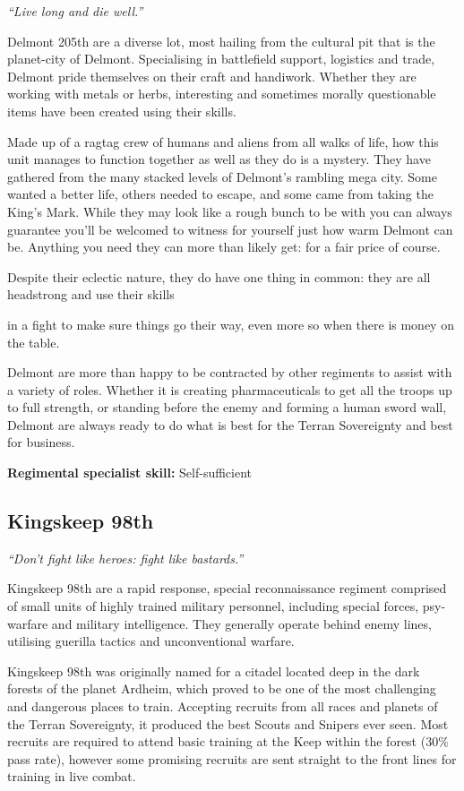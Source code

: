 \textit{``Live long and die well.''}

Delmont 205th are a diverse lot, most hailing from the cultural pit that is the planet-city of Delmont. Specialising in battlefield support, logistics and trade, Delmont pride themselves on their craft and handiwork. Whether they are working with metals or herbs, interesting and sometimes morally questionable items have been created using their skills.

Made up of a ragtag crew of humans and aliens from all walks of life, how this unit manages to function together as well as they do is a mystery. They have gathered from the many stacked levels of Delmont's rambling mega city. Some wanted a better life, others needed to escape, and some came from taking the King's Mark. While they may look like a rough bunch to be with you can always guarantee you'll be welcomed to witness for yourself just how warm Delmont can be. Anything you need they can more than likely get: for a fair price of course.

Despite their eclectic nature, they do have one thing in common: they are all headstrong and use their skills

in a fight to make sure things go their way, even more so when there is money on the table.

Delmont are more than happy to be contracted by other regiments to assist with a variety of roles. Whether it is creating pharmaceuticals to get all the troops up to full strength, or standing before the enemy and forming a human sword wall, Delmont are always ready to do what is best for the Terran Sovereignty and best for business.

\textbf{Regimental specialist skill:} Self-sufficient

\subsection{Kingskeep 98th}

\textit{``Don't fight like heroes: fight like bastards.''}

Kingskeep 98th are a rapid response, special reconnaissance regiment comprised of small units of highly trained military personnel, including special forces, psy-warfare and military intelligence. They generally operate behind enemy lines, utilising guerilla tactics and unconventional warfare.

Kingskeep 98th was originally named for a citadel located deep in the dark forests of the planet Ardheim, which proved to be one of the most challenging and dangerous places to train. Accepting recruits from all races and planets of the Terran Sovereignty, it produced the best Scouts and Snipers ever seen. Most recruits are required to attend basic training at the Keep within the forest (30\% pass rate), however some promising recruits are sent straight to the front lines for training in live combat.

